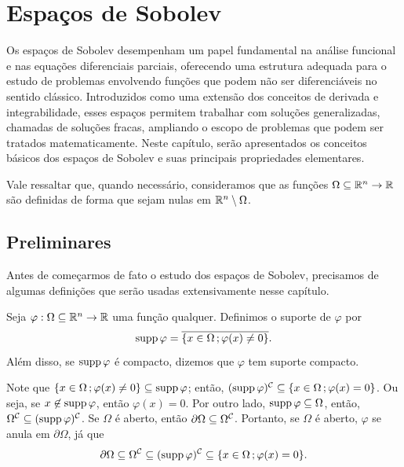 \chapter{Espaços de Sobolev} \label{ch:sobolev}

Os espaços de Sobolev desempenham um papel fundamental na análise funcional e nas equações diferenciais parciais, oferecendo uma estrutura adequada para o estudo de problemas envolvendo funções que podem não ser diferenciáveis no sentido clássico. Introduzidos como uma extensão dos conceitos de derivada e integrabilidade, esses espaços permitem trabalhar com soluções generalizadas, chamadas de soluções fracas, ampliando o escopo de problemas que podem ser tratados matematicamente. Neste capítulo, serão apresentados os conceitos básicos dos espaços de Sobolev e suas principais propriedades elementares.

Vale ressaltar que, quando necessário, consideramos que as funções $\Omega \subseteq \mathbb{R}^n \to \mathbb{R}$ são definidas de forma que sejam nulas em $\mathbb{R}^n \setminus \Omega$. 
\section{Preliminares}

Antes de começarmos de fato o estudo dos espaços de Sobolev, precisamos de algumas definições que serão usadas extensivamente nesse capítulo.

\begin{dbox} \label{def:suporte}
    Seja $\varphi : \Omega \subseteq \mathbb{R} ^n \to \mathbb{R}$ uma função qualquer. Definimos o suporte de $\varphi$ por
    \[
        \mathrm{supp}\, \varphi = \overline{\{x \in \Omega \,; \varphi(x) \neq 0\}}.
    \]
    Além disso, se $\mathrm{supp}\,\varphi$ é compacto, dizemos que $\varphi$ tem suporte compacto.
\end{dbox}

Note que $\{x \in \Omega \,; \varphi(x) \neq 0\} \subseteq \mathrm{supp}\, \varphi$; então\footnotemark, $(\mathrm{supp}\, \varphi)^{\mathcal{C}} \subseteq \{x \in \Omega \,; \varphi(x) = 0\}$. Ou seja, se $x \not\in \mathrm{supp}\, \varphi$, então $\varphi(x) = 0$.
Por outro lado, $\mathrm{supp}\, \varphi \subseteq \Omega$, então, $\Omega^{\mathcal{C}} \subseteq (\mathrm{supp}\, \varphi)^{\mathcal{C}}$. 
Se $\Omega$ é aberto, então $\partial \Omega \subseteq \Omega^{\mathcal{C}}$.
Portanto, se $\Omega$ é aberto, $\varphi$ se anula em $\partial\Omega$, já que
\[
    \partial \Omega \subseteq \Omega^{\mathcal{C}} \subseteq (\mathrm{supp}\, \varphi)^{\mathcal{C}} \subseteq \{x \in \Omega \,; \varphi(x) = 0\}.
\]

